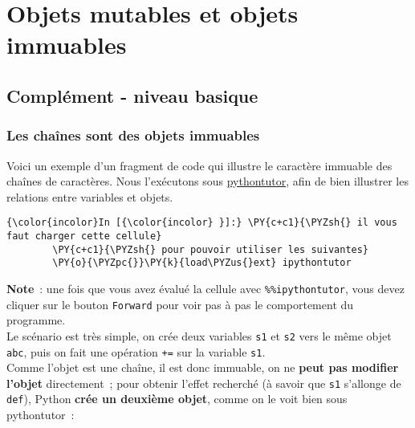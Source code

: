     \hypertarget{objets-mutables-et-objets-immuables}{%
\section{Objets mutables et objets
immuables}\label{objets-mutables-et-objets-immuables}}

    \hypertarget{compluxe9ment---niveau-basique}{%
\subsection{Complément - niveau
basique}\label{compluxe9ment---niveau-basique}}

    \hypertarget{les-chauxeenes-sont-des-objets-immuables}{%
\subsubsection{Les chaînes sont des objets
immuables}\label{les-chauxeenes-sont-des-objets-immuables}}

    Voici un exemple d'un fragment de code qui illustre le caractère
immuable des chaînes de caractères. Nous l'exécutons sous
\href{pythontutor.com}{pythontutor}, afin de bien illustrer les
relations entre variables et objets.

    \begin{Verbatim}[commandchars=\\\{\}]
{\color{incolor}In [{\color{incolor} }]:} \PY{c+c1}{\PYZsh{} il vous faut charger cette cellule}
        \PY{c+c1}{\PYZsh{} pour pouvoir utiliser les suivantes}
        \PY{o}{\PYZpc{}}\PY{k}{load\PYZus{}ext} ipythontutor
\end{Verbatim}


    \textbf{Note}~: une fois que vous avez évalué la cellule avec
\texttt{\%\%ipythontutor}, vous devez cliquer sur le bouton
\texttt{Forward} pour voir pas à pas le comportement du programme.\\

    Le scénario est très simple, on crée deux variables \texttt{s1} et
\texttt{s2} vers le même objet
\texttt{\textquotesingle{}abc\textquotesingle{}}, puis on fait une
opération \texttt{+=} sur la variable \texttt{s1}.\\

Comme l'objet est une chaîne, il est donc immuable, on ne \textbf{peut
pas modifier l'objet} directement~; pour obtenir l'effet recherché (à
savoir que \texttt{s1} s'allonge de
\texttt{\textquotesingle{}def\textquotesingle{}}), Python \textbf{crée
un deuxième objet}, comme on le voit bien sous pythontutor~:

